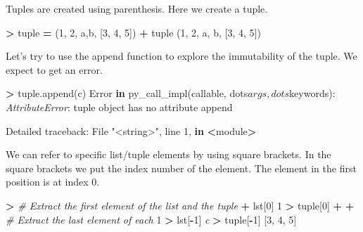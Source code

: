 \documentclass[
]{book}
\newenvironment{Shaded}{\begin{snugshade}}{\end{snugshade}}
\newcommand{\BuiltInTok}[1]{#1}
\newcommand{\CommentTok}[1]{\textcolor[rgb]{0.56,0.35,0.01}{\textit{#1}}}
\newcommand{\DecValTok}[1]{\textcolor[rgb]{0.00,0.00,0.81}{#1}}
\newcommand{\KeywordTok}[1]{\textcolor[rgb]{0.13,0.29,0.53}{\textbf{#1}}}
\newcommand{\NormalTok}[1]{#1}
\newcommand{\OperatorTok}[1]{\textcolor[rgb]{0.81,0.36,0.00}{\textbf{#1}}}
\newcommand{\PreprocessorTok}[1]{\textcolor[rgb]{0.56,0.35,0.01}{\textit{#1}}}
\newcommand{\StringTok}[1]{\textcolor[rgb]{0.31,0.60,0.02}{#1}}
\begin{document}
Tuples are created using parenthesis. Here we create a tuple.

\begin{Shaded}
\begin{Highlighting}[]
\OperatorTok{\textgreater{}} \BuiltInTok{tuple} \OperatorTok{=}\NormalTok{ (}\DecValTok{1}\NormalTok{, }\DecValTok{2}\NormalTok{, }\StringTok{\textquotesingle{}a\textquotesingle{}}\NormalTok{,}\StringTok{\textquotesingle{}b\textquotesingle{}}\NormalTok{, [}\DecValTok{3}\NormalTok{, }\DecValTok{4}\NormalTok{, }\DecValTok{5}\NormalTok{])}
\OperatorTok{+} \BuiltInTok{tuple} 
\NormalTok{(}\DecValTok{1}\NormalTok{, }\DecValTok{2}\NormalTok{, }\StringTok{\textquotesingle{}a\textquotesingle{}}\NormalTok{, }\StringTok{\textquotesingle{}b\textquotesingle{}}\NormalTok{, [}\DecValTok{3}\NormalTok{, }\DecValTok{4}\NormalTok{, }\DecValTok{5}\NormalTok{])}
\end{Highlighting}
\end{Shaded}

Let's try to use the append function to explore the immutability of the tuple. We expect to get an error.

\begin{Shaded}
\begin{Highlighting}[]
\OperatorTok{\textgreater{}} \BuiltInTok{tuple}\NormalTok{.append(}\StringTok{\textquotesingle{}c\textquotesingle{}}\NormalTok{)}
\NormalTok{Error }\KeywordTok{in}\NormalTok{ py\_call\_impl(}\BuiltInTok{callable}\NormalTok{, dots$args, dots$keywords): }\PreprocessorTok{AttributeError}\NormalTok{: }\StringTok{\textquotesingle{}tuple\textquotesingle{}} \BuiltInTok{object}\NormalTok{ has no attribute }\StringTok{\textquotesingle{}append\textquotesingle{}}

\NormalTok{Detailed traceback:}
\NormalTok{  File }\StringTok{"\textless{}string\textgreater{}"}\NormalTok{, line }\DecValTok{1}\NormalTok{, }\KeywordTok{in} \OperatorTok{\textless{}}\NormalTok{module}\OperatorTok{\textgreater{}}
\end{Highlighting}
\end{Shaded}

We can refer to specific list/tuple elements by using square brackets. In the square brackets we put the index number of the element. The element in the first position is at index 0.

\begin{Shaded}
\begin{Highlighting}[]
\OperatorTok{\textgreater{}} \CommentTok{\# Extract the first element of the list and the tuple}
\OperatorTok{+}\NormalTok{ lst[}\DecValTok{0}\NormalTok{]}
\DecValTok{1}
\OperatorTok{\textgreater{}} \BuiltInTok{tuple}\NormalTok{[}\DecValTok{0}\NormalTok{]}
\OperatorTok{+} 
\OperatorTok{+} \CommentTok{\# Extract the last element of each }
\DecValTok{1}
\OperatorTok{\textgreater{}}\NormalTok{ lst[}\OperatorTok{{-}}\DecValTok{1}\NormalTok{]}
\CommentTok{\textquotesingle{}c\textquotesingle{}}
\OperatorTok{\textgreater{}} \BuiltInTok{tuple}\NormalTok{[}\OperatorTok{{-}}\DecValTok{1}\NormalTok{]}
\NormalTok{[}\DecValTok{3}\NormalTok{, }\DecValTok{4}\NormalTok{, }\DecValTok{5}\NormalTok{]}
\end{Highlighting}
\end{Shaded}
\end{document}

